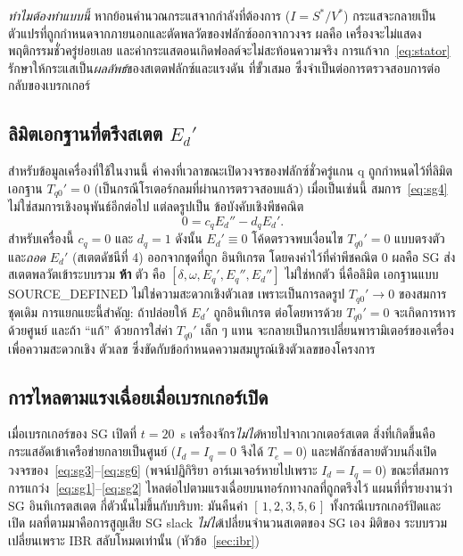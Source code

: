 \documentclass[12pt,a4paper]{article}
\begin{document}
\emph{ทำไมต้องทำแบบนี้} หากย้อนคำนวณกระแสจากกำลังที่ต้องการ ($I=S^{*}/V^{*}$)
กระแสจะกลายเป็นตัวแปรที่ถูกกำหนดจากภายนอกและตัดพลวัตของฟลักซ์ออกจากวงจร ผลคือ
เครื่องจะไม่แสดงพฤติกรรมชั่วครู่ย่อยเลย และค่ากระแสตอนเกิดฟอลต์จะไม่สะท้อนความจริง
การแก้จาก~\eqref{eq:stator} รักษาให้กระแสเป็น\emph{ผลลัพธ์}ของสเตตฟลักซ์และแรงดัน
ที่ขั้วเสมอ ซึ่งจำเป็นต่อการตรวจสอบการต่อกลับของเบรกเกอร์

\subsection{ลิมิตเอกฐานที่ตรึงสเตต $E_d'$}\label{sec:frozen}
สำหรับข้อมูลเครื่องที่ใช้ในงานนี้ ค่าคงที่เวลาขณะเปิดวงจรของฟลักซ์ชั่วครู่แกน q
ถูกกำหนดไว้ที่ลิมิตเอกฐาน $T_{q0}'=0$ (เป็นกรณีโรเตอร์กลมที่ผ่านการตรวจสอบแล้ว)
เมื่อเป็นเช่นนี้ สมการ~\eqref{eq:sg4} ไม่ใช่สมการเชิงอนุพันธ์อีกต่อไป แต่ลดรูปเป็น
ข้อบังคับเชิงพีชคณิต
\begin{equation}
  0 = c_q E_d'' - d_q E_d'.
\end{equation}
สำหรับเครื่องนี้ $c_q=0$ และ $d_q=1$ ดังนั้น $E_d'\equiv 0$ โค้ดตรวจพบเงื่อนไข
$T_{q0}'=0$ แบบตรงตัว และ\emph{ถอด} $E_d'$ (สเตตดัชนีที่ 4) ออกจากชุดที่ถูก
อินทิเกรต โดยคงค่าไว้ที่ค่าพีชคณิต $0$ ผลคือ SG ส่งสเตตพลวัตเข้าระบบรวม
\textbf{ห้า} ตัว คือ $[\delta,\omega,E_q',E_q'',E_d'']$ ไม่ใช่หกตัว นี่คือลิมิต
เอกฐานแบบ \textsf{SOURCE\_DEFINED} ไม่ใช่ความสะดวกเชิงตัวเลข เพราะเป็นการลดรูป
$T_{q0}'\to0$ ของสมการชุดเดิม การแยกแยะนี้สำคัญ: ถ้าปล่อยให้ $E_d'$ ถูกอินทิเกรต
ต่อโดยหารด้วย $T_{q0}'=0$ จะเกิดการหารด้วยศูนย์ และถ้า ``แก้'' ด้วยการใส่ค่า
$T_{q0}'$ เล็ก ๆ แทน จะกลายเป็นการเปลี่ยนพารามิเตอร์ของเครื่องเพื่อความสะดวกเชิง
ตัวเลข ซึ่งขัดกับข้อกำหนดความสมบูรณ์เชิงตัวเลขของโครงการ

\subsection{การไหลตามแรงเฉื่อยเมื่อเบรกเกอร์เปิด}
เมื่อเบรกเกอร์ของ SG เปิดที่ $t=20$~s เครื่องจักร\emph{ไม่ได้}หายไปจากเวกเตอร์สเตต
สิ่งที่เกิดขึ้นคือกระแสอัดเข้าเครือข่ายกลายเป็นศูนย์ ($I_d=I_q=0$ จึงได้ $T_e=0$)
และฟลักซ์สลายตัวบนกิ่งเปิดวงจรของ~\eqref{eq:sg3}--\eqref{eq:sg6} (พจน์ปฏิกิริยา
อาร์เมเจอร์หายไปเพราะ $I_d=I_q=0$) ขณะที่สมการการแกว่ง~\eqref{eq:sg1}--\eqref{eq:sg2}
ไหลต่อไปตามแรงเฉื่อยบนทอร์กทางกลที่ถูกตรึงไว้ แผนที่ที่รายงานว่า SG อินทิเกรตสเตต
กี่ตัวนั้นไม่ขึ้นกับบริบท: มันคืนค่า $[\,1,2,3,5,6\,]$ ทั้งกรณีเบรกเกอร์ปิดและเปิด
ผลที่ตามมาคือการสูญเสีย SG slack \emph{ไม่ได้}เปลี่ยนจำนวนสเตตของ SG เอง มิติของ
ระบบรวมเปลี่ยนเพราะ IBR สลับโหมดเท่านั้น (หัวข้อ~\ref{sec:ibr})
\end{document}

